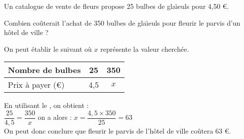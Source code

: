 \begin{myex}
	Un catalogue de vente de fleurs propose 25 bulbes de gla\"{\i}euls pour 4,50 €.
	
	Combien coûterait l'achat de 350 bulbes de gla\"{\i}euls pour fleurir le parvis d'un hôtel de ville ?\\
	
	\mysp
	
	On peut établir le  suivant où $x$ représente la valeur cherchée.
	
	\begin{center}
		\begin{tabular}{|@{\ }l@{\ }|@{\ }c@{\ }|@{\ }c@{\ }|}
			\hline
			Nombre de bulbes & 25 & 350  \\ \hline
			Prix à payer (€) & 4,5 & $x$  \\ \hline
		\end{tabular}
	\end{center}
	
	En utilisant le , on obtient : \\
	
	$\dfrac{25}{4,5} = \dfrac{350}{x}$ on a alors : $x = \dfrac{4,5 \times 350}{25} = 63$\\
	
	On peut donc conclure que fleurir le parvis de l'hôtel de ville coûtera 63 €.
\end{myex}

